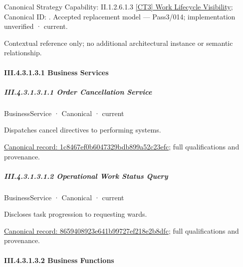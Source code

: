 {\small Canonical Strategy Capability: II.1.2.6.1.3 \hyperref[element:5239aba7e072422686d108950a5b0d50]{[CT3] Work Lifecycle Visibility}; Canonical ID: \texttt{}. Accepted replacement model — Pass3/014; implementation unverified · current.}\par
Contextual reference only; no additional architectural instance or semantic relationship.\par
\paragraph*{III.4.3.1.3.1 Business Services}
\label{navigation:III.4.3.1.3.1}

\subparagraph*{III.4.3.1.3.1.1 Order Cancellation Service}
\label{navigation:III.4.3.1.3.1.1}

\label{element:1c8467ef0b6047329bdb899a52c23efc}
{\small BusinessService · Canonical · current}\par

Dispatches cancel directives to performing systems.


{\footnotesize \href{../../../../../../../continuum/business/business-service/1c8467ef0b6047329bdb899a52c23efc.md}{Canonical record: 1c8467ef0b6047329bdb899a52c23efc}; full qualifications and provenance.}\par
\subparagraph*{III.4.3.1.3.1.2 Operational Work Status Query}
\label{navigation:III.4.3.1.3.1.2}

\label{element:8659408923e641b99727ef218e2b8dfc}
{\small BusinessService · Canonical · current}\par

Discloses task progression to requesting wards.


{\footnotesize \href{../../../../../../../continuum/business/business-service/8659408923e641b99727ef218e2b8dfc.md}{Canonical record: 8659408923e641b99727ef218e2b8dfc}; full qualifications and provenance.}\par
\paragraph*{III.4.3.1.3.2 Business Functions}
\label{navigation:III.4.3.1.3.2}

